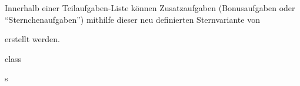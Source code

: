 \begin{macro}{\item*}
Innerhalb einer Teilaufgaben-Liste können Zusatzaufgaben (Bonusaufgaben oder "`Sternchenaufgaben"') mithilfe dieser neu definierten Sternvariante von \Macro\item erstellt werden.
\begin{MacroCode}{class}
\let\itemorig\item

\DeclareDocumentCommand \item { s } {%
   {
    \itemorig[\multiexelabelboxed*]
  }{
    \itemorig
  }
}

\end{MacroCode}
\end{macro}
